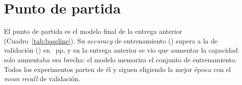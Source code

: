 \section{Punto de partida}
El punto de partida es el modelo final de la entrega anterior (Cuadro~\ref{tab:baseline}). Su \emph{accuracy} de
entrenamiento () supera a la de validación () en ~pp, y
en la entrega anterior se vio que aumentar la capacidad solo aumentaba esa brecha: el modelo memoriza el conjunto de
entrenamiento. Todos los experimentos parten de él y siguen eligiendo la mejor época con el \emph{mean recall} de
validación.

\begin{table}[h]
  \centering
  \caption{Modelo de partida (final de la entrega 1) y sus métricas (media $\pm$ desviación típica de 
  semillas).}
  \label{tab:baseline}
\end{table}
